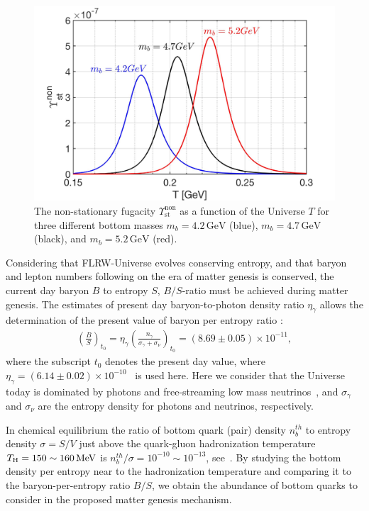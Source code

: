 \begin{figure}
\centerline{\includegraphics[width=0.8\linewidth]{./plots/NonstationaryFugacity}}
\caption{The non-stationary fugacity $\Upsilon_\mathrm{st}^{\mathrm{non}}$ as a function of the Universe $T$ for three different bottom masses $m_b=4.2\,\mathrm{GeV}$ (blue), $m_b=4.7\,\mathrm{GeV}$ (black), and $m_b=5.2\,\mathrm{GeV}$ (red). }
\label{NonFugacity}
\end{figure}
 

 Considering that FLRW-Universe evolves conserving entropy, and that baryon and lepton numbers following on the era of matter genesis is conserved, the current day baryon $B$ to entropy $S$, $B/S$-ratio must be achieved during matter genesis. The estimates of present day baryon-to-photon density ratio $\eta_\gamma$ allows the determination of the present value of baryon per entropy ratio \cite{Fromerth:2012fe,Rafelski:2019twp,Letessier:2002ony,Fromerth:2002wb}:
\begin{align}
\left(\frac{B}{S}\right)_{t_0}\!\!\!\!=\eta_\gamma\left(\frac{n_\gamma}{\sigma_\gamma+\sigma_\nu}\right)_{\!t_0}\!\!\!\!=(8.69\pm0.05)\!\!\times\!\!10^{-11},
\end{align}
where the subscript $t_0$ denotes the present day value, where $\eta_\gamma=(6.14\pm0.02)\times10^{-10}$~\cite{ParticleDataGroup:2022pth}  is used here. Here we consider that the Universe today is dominated by photons and free-streaming  low mass neutrinos~\cite{Birrell:2012gg}, and $\sigma_\gamma$ and $\sigma_\nu$ are the entropy density for photons and neutrinos, respectively. 
 
In chemical equilibrium the ratio of bottom quark (pair) density $n_b^{th}$ to entropy density $\sigma=S/V$ just above the quark-gluon hadronization temperature $T_\mathrm{H}=150\sim160\text{\,MeV}$ is $n_b^{th}/\sigma=10^{-10}\sim 10^{-13}$, see~. By studying the bottom density per entropy near to the hadronization temperature and comparing it to the baryon-per-entropy ratio $B/S$, we obtain the abundance of bottom quarks to consider in the proposed matter genesis mechanism.

